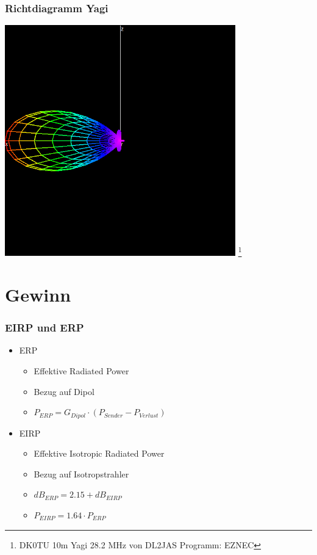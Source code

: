 \begin{frame}
    \frametitle{Richtdiagramm Yagi}
    \begin{center}
        \includegraphics[width=0.75\textwidth]{e11/yagi_gain.png}
        \footnote{\tiny DK0TU 10m Yagi 28.2 MHz von DL2JAS Programm: EZNEC}
	\end{center}
\end{frame}

\section*{Gewinn}

\begin{frame}
    \frametitle{EIRP und ERP}
    \begin{itemize}
    	\item ERP
		    \begin{itemize}
				\item Effektive Radiated Power
       		 	\item Bezug auf Dipol
       		 	\item $P_{ERP} = G_{Dipol} \cdot (P_{Sender} - P_{Verlust})$
 		   	\end{itemize}
		\item EIRP
		    \begin{itemize}
				\item Effektive Isotropic Radiated Power
       		 	\item Bezug auf Isotropstrahler
       		 	\item $dB_{ERP} = 2.15 + dB_{EIRP}$
       		 	\item $P_{EIRP} = 1.64 \cdot P_{ERP}$
 		   	\end{itemize}
    \end{itemize}
\end{frame}

